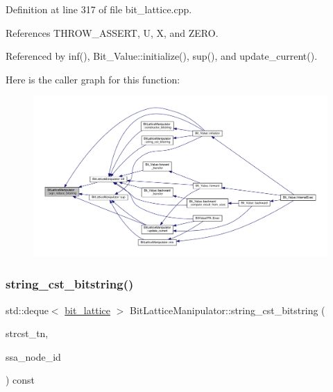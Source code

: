 Definition at line 317 of file bit\+\_\+lattice.\+cpp.



References T\+H\+R\+O\+W\+\_\+\+A\+S\+S\+E\+RT, U, X, and Z\+E\+RO.



Referenced by inf(), Bit\+\_\+\+Value\+::initialize(), sup(), and update\+\_\+current().

Here is the caller graph for this function\+:
\nopagebreak
\begin{figure}[H]
\begin{center}
\leavevmode
\includegraphics[width=350pt]{dd/d98/classBitLatticeManipulator_a1783e3d23d32aed27ec5ada1229516dc_icgraph}
\end{center}
\end{figure}
\mbox{\label{classBitLatticeManipulator_a0880fc86301b0fbd131c668d79819e78}} 
\subsubsection{\texorpdfstring{string\+\_\+cst\+\_\+bitstring()}{string\_cst\_bitstring()}}
{\footnotesize\ttfamily std\+::deque$<$ \hyperlink{bit__lattice_8hpp_ab732360111c810c4eaeb4c8b81d160d6}{bit\+\_\+lattice} $>$ Bit\+Lattice\+Manipulator\+::string\+\_\+cst\+\_\+bitstring (\begin{DoxyParamCaption}\item[{const \hyperlink{tree__node_8hpp_a6ee377554d1c4871ad66a337eaa67fd5}{tree\+\_\+node\+Ref} \&}]{strcst\+\_\+tn,  }\item[{unsigned int}]{ssa\+\_\+node\+\_\+id }\end{DoxyParamCaption}) const\hspace{0.3cm}{\ttfamily [protected]}}



